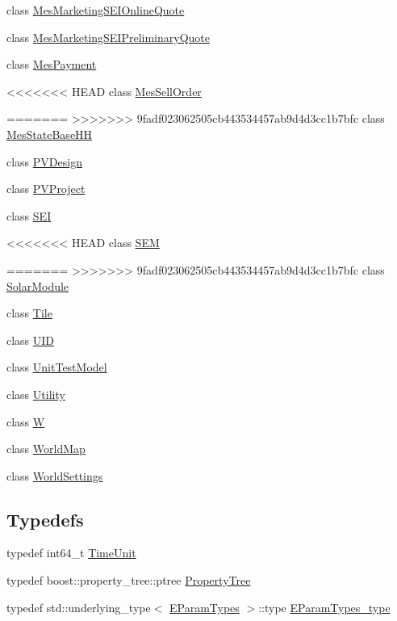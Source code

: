 \begin{DoxyCompactItemize}
class \hyperlink{classsolar__core_1_1_mes_marketing_s_e_i_online_quote}{Mes\+Marketing\+S\+E\+I\+Online\+Quote}
\item 
class \hyperlink{classsolar__core_1_1_mes_marketing_s_e_i_preliminary_quote}{Mes\+Marketing\+S\+E\+I\+Preliminary\+Quote}
\item 
class \hyperlink{classsolar__core_1_1_mes_payment}{Mes\+Payment}
\item 
<<<<<<< HEAD
class \hyperlink{classsolar__core_1_1_mes_sell_order}{Mes\+Sell\+Order}
\item 
=======
>>>>>>> 9fadf023062505cb443534457ab9d4d3cc1b7bfc
class \hyperlink{classsolar__core_1_1_mes_state_base_h_h}{Mes\+State\+Base\+H\+H}
\item 
class \hyperlink{classsolar__core_1_1_p_v_design}{P\+V\+Design}
\item 
class \hyperlink{classsolar__core_1_1_p_v_project}{P\+V\+Project}
\item 
class \hyperlink{classsolar__core_1_1_s_e_i}{S\+E\+I}
\item 
<<<<<<< HEAD
class \hyperlink{classsolar__core_1_1_s_e_m}{S\+E\+M}
\item 
=======
>>>>>>> 9fadf023062505cb443534457ab9d4d3cc1b7bfc
class \hyperlink{classsolar__core_1_1_solar_module}{Solar\+Module}
\item 
class \hyperlink{classsolar__core_1_1_tile}{Tile}
\item 
class \hyperlink{classsolar__core_1_1_u_i_d}{U\+I\+D}
\item 
class \hyperlink{classsolar__core_1_1_unit_test_model}{Unit\+Test\+Model}
\item 
class \hyperlink{classsolar__core_1_1_utility}{Utility}
\item 
class \hyperlink{classsolar__core_1_1_w}{W}
\item 
class \hyperlink{classsolar__core_1_1_world_map}{World\+Map}
\item 
class \hyperlink{classsolar__core_1_1_world_settings}{World\+Settings}
\end{DoxyCompactItemize}
\subsection*{Typedefs}
\begin{DoxyCompactItemize}
\item 
typedef int64\+\_\+t \hyperlink{namespacesolar__core_a4b5949d07259da6f8a20d12a30403e90}{Time\+Unit}
\item 
typedef boost\+::property\+\_\+tree\+::ptree \hyperlink{namespacesolar__core_adeda2737d6938c190eb774a5b2495045}{Property\+Tree}
\item 
typedef std\+::underlying\+\_\+type$<$ \hyperlink{namespacesolar__core_aa1147341e5ef7a40d68d1bd68e149362}{E\+Param\+Types} $>$\+::type \hyperlink{namespacesolar__core_a256e8e2dc052f522b522d3f90b294caf}{E\+Param\+Types\+\_\+type}
\end{DoxyCompactItemize}
